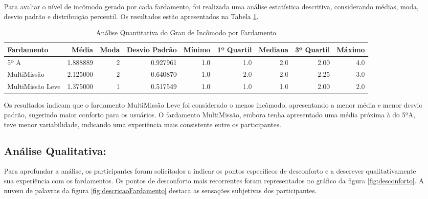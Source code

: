         Para avaliar o nível de incômodo gerado por cada fardamento, foi realizada uma análise 
        estatística descritiva, considerando médias, moda, desvio padrão e distribuição percentil. Os resultados 
        estão apresentados na Tabela \ref{tab:analise_fardamento}.
        \begin{table}[H]
                \centering
                \caption{Análise Quantitativa do Grau de Incômodo por Fardamento}
                \label{tab:analise_fardamento}
                \footnotesize
                \begin{tabular}{lrrrrrrrr}
                \toprule
                Fardamento &     Média &  Moda &  Desvio Padrão &  Mínimo &  1º Quartil &  Mediana &  3º Quartil &  Máximo \\
                \midrule
                5º A             &  1.888889 &     2 &       0.927961 &     1.0 &         1.0 &      2.0 &        2.00 &     4.0 \\
                MultiMissão      &  2.125000 &     2 &       0.640870 &     1.0 &         2.0 &      2.0 &        2.25 &     3.0 \\
                MultiMissão Leve &  1.375000 &     1 &       0.517549 &     1.0 &         1.0 &      1.0 &        2.00 &     2.0 \\
                \bottomrule
                \end{tabular}
                \end{table}
    

        Os resultados indicam que o fardamento MultiMissão Leve foi considerado o menos incômodo, 
        apresentando a menor média e menor desvio padrão, sugerindo maior conforto para os usuários. 
        O fardamento MultiMissão, embora tenha apresentado uma média próxima à do 5ºA, teve menor 
        variabilidade, indicando uma experiência mais consistente entre os participantes.
            


 
    \subsection{ Análise Qualitativa:}
        Para aprofundar a análise, os participantes foram solicitados a indicar os pontos específicos 
        de desconforto e a descrever qualitativamente sua experiência com os fardamentos. Os pontos 
        de desconforto mais recorrentes foram representados no gráfico da figura \ref{fig:desconforto}. 
        A nuvem de palavras da figura \ref{fig:descricaoFardamento} destaca as sensações subjetivas 
        dos participantes. 
        
